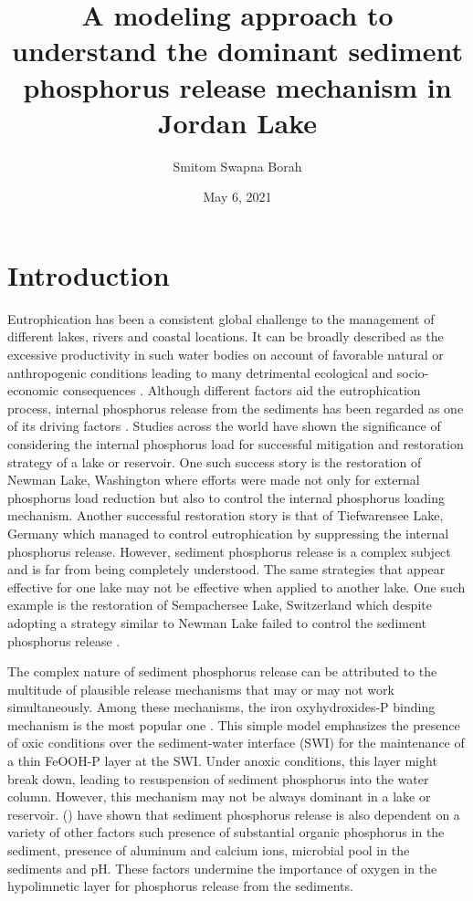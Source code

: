 \documentclass[fleqn]{article}
\title{A modeling approach to understand the dominant sediment phosphorus release mechanism in Jordan Lake}
\author{Smitom Swapna Borah}
\date{May 6, 2021}
\newcommand{\mycite}[1]{\citeauthor{#1} (\citeyear{#1})}
\begin{document}
\maketitle


\section{Introduction}
Eutrophication has been a consistent global challenge to the management of different lakes, rivers and coastal locations. It can be broadly described as the excessive productivity in such water bodies on account of favorable natural or anthropogenic conditions leading to many detrimental ecological and socio-economic consequences \parencite{LeMoal2019}. Although different factors aid the eutrophication process, internal phosphorus release from the sediments has been regarded as one of its driving factors \parencite{Nurnberg2009}. Studies across the world have shown the significance of considering the internal phosphorus load for successful mitigation and restoration strategy of a lake or reservoir. One such success story is the restoration of Newman Lake, Washington where efforts were made not only for external phosphorus load reduction but also to control the internal phosphorus loading mechanism. Another successful restoration story is that of Tiefwarensee Lake, Germany which managed to control eutrophication by suppressing the internal phosphorus release. However, sediment phosphorus release is a complex subject and is far from being completely understood. The same strategies that appear effective for one lake may not be effective when applied to another lake. One such example is the restoration of Sempachersee Lake, Switzerland which despite adopting a strategy similar to Newman Lake failed to control the sediment phosphorus release \parencite{Nurnberg2009}.  

The complex nature of sediment phosphorus release can be attributed to the multitude of plausible release mechanisms that may or may not work simultaneously. Among these mechanisms, the iron oxyhydroxides-P binding mechanism is the most popular one \parencite{mortimer1942}. This simple model emphasizes the presence of oxic conditions over the sediment-water interface (SWI) for the maintenance of a thin FeOOH-P layer at the SWI. Under anoxic conditions, this layer might break down, leading to resuspension of sediment phosphorus into the water column. However, this mechanism may not be always dominant in a lake or reservoir. \mycite{Hupfer2008} have shown that sediment phosphorus release is also dependent on a variety of other factors such presence of substantial organic phosphorus in the sediment, presence of aluminum and calcium ions, microbial pool in the sediments and pH. These factors undermine the importance of oxygen in the hypolimnetic layer for phosphorus release from the sediments.
\end{document}
